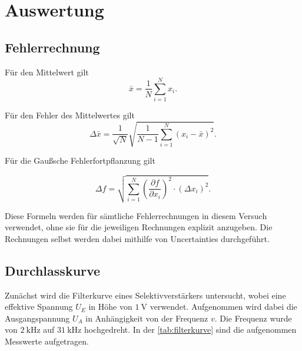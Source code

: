 \section{Auswertung}
\label{sec:auswertung}

\subsection{Fehlerrechnung}
\label{sec:Fehlerrechnung}

    Für den Mittelwert gilt
    \begin{equation}
    \bar{x} = \frac{1}{N}\sum\limits_{i = 1}^N x_i .
    \end{equation}

    Für den Fehler des Mittelwertes gilt
    \begin{equation}
        \Delta \bar{x}=\frac{1}{\sqrt{N}} \sqrt{\frac{1}{N-1} \sum_{i=1}^N\left(x_i-\bar{x}\right)^2}.
        \end{equation}

    Für die Gaußsche Fehlerfortpflanzung gilt

    \begin{equation}
        \Delta f=\sqrt{\sum_{i=1}^N\left(\frac{\partial f}{\partial x_i}\right)^2 \cdot\left(\Delta x_i\right)^2}.
    \end{equation}

    Diese Formeln werden für sämtliche Fehlerrechnungen in diesem Versuch verwendet, ohne sie für die 
    jeweiligen Rechnungen explizit anzugeben. Die Rechnungen selbst werden dabei mithilfe von
    Uncertainties durchgeführt.

\subsection{Durchlasskurve}
\label{sec:Durchlasskurve}

Zunächst wird die Filterkurve eines Selektivverstärkers untersucht, wobei eine effektive Spannung $U_E$ in Höhe von $ \SI{1}{\volt}$ 
verwendet. Aufgenommen wird dabei die Ausgangspannung $U_A$ in Anhängigkeit von der Frequenz $v$. Die Frequenz wurde von $\SI{2}{\kHz}$ auf 
$\SI{31}{\kHz}$ hochgedreht. In der \autoref{tab:filterkurve} sind die aufgenommen Messwerte aufgetragen.

